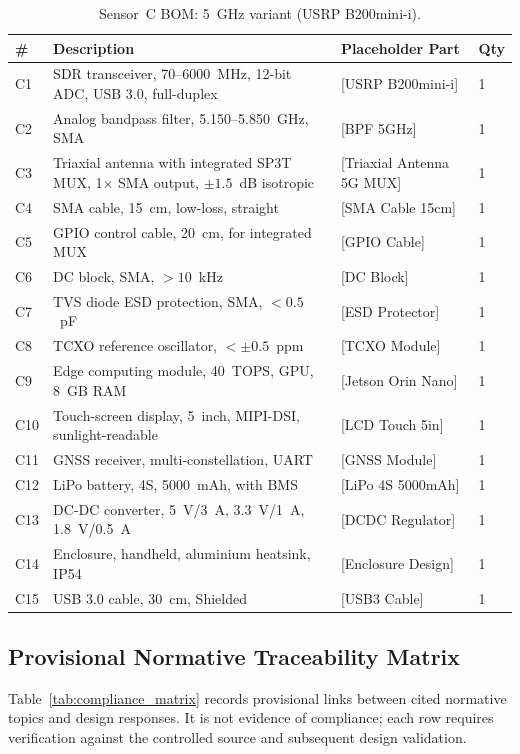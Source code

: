 \documentclass[11pt,a4paper]{article}
\begin{document}
\begin{table}[ht]
\centering
\caption{Sensor~C BOM: 5~GHz variant (USRP B200mini-i).}
\label{tab:bom_sensorC}
\small
\begin{tabular}{L{1.0cm} L{5.0cm} L{4.0cm} C{2.0cm}}
\toprule
\textbf{\#} & \textbf{Description} & \textbf{Placeholder Part} & \textbf{Qty} \\
\midrule
C1 & SDR transceiver, 70--6000~MHz, 12-bit ADC, USB 3.0, full-duplex & [USRP B200mini-i] & 1 \\
C2 & Analog bandpass filter, 5.150--5.850~GHz, SMA & [BPF 5GHz] & 1 \\
C3 & Triaxial antenna with integrated SP3T MUX, 1$\times$ SMA output, $\pm 1.5$~dB isotropic & [Triaxial Antenna 5G MUX] & 1 \\
C4 & SMA cable, 15~cm, low-loss, straight & [SMA Cable 15cm] & 1 \\
C5 & GPIO control cable, 20~cm, for integrated MUX & [GPIO Cable] & 1 \\
C6 & DC block, SMA, $> 10$~kHz & [DC Block] & 1 \\
C7 & TVS diode ESD protection, SMA, $< 0.5$~pF & [ESD Protector] & 1 \\
C8 & TCXO reference oscillator, $< \pm 0.5$~ppm & [TCXO Module] & 1 \\
C9 & Edge computing module, 40~TOPS, GPU, 8~GB RAM & [Jetson Orin Nano] & 1 \\
C10 & Touch-screen display, 5~inch, MIPI-DSI, sunlight-readable & [LCD Touch 5in] & 1 \\
C11 & GNSS receiver, multi-constellation, UART & [GNSS Module] & 1 \\
C12 & LiPo battery, 4S, 5000~mAh, with BMS & [LiPo 4S 5000mAh] & 1 \\
C13 & DC-DC converter, 5~V/3~A, 3.3~V/1~A, 1.8~V/0.5~A & [DCDC Regulator] & 1 \\
C14 & Enclosure, handheld, aluminium heatsink, IP54 & [Enclosure Design] & 1 \\
C15 & USB 3.0 cable, 30~cm, Shielded & [USB3 Cable] & 1 \\
\bottomrule
\end{tabular}
\end{table}

\subsection{Provisional Normative Traceability Matrix}

Table~\ref{tab:compliance_matrix} records provisional links between cited normative topics and design responses. It is not evidence of compliance; each row requires verification against the controlled source and subsequent design validation.
\end{document}
